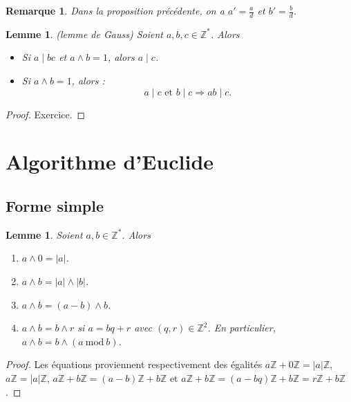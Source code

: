 \documentclass[12pt]{report}
\newtheorem*{rem}{Remarque}
\newtheorem{Lem}[thm]{Lemme}
\newcommand{\Z}{\mathbb{Z}}
\begin{document}
\begin{rem}
Dans la proposition précédente, on a $a'=\frac{a}{d}$ et $b'=\frac{b}{d}$.
\end{rem}


\begin{Lem}\label{lem_Gauss}(lemme de Gauss) Soient $a,b,c \in \mathbb{Z}^*$. Alors
\begin{itemize}
\item[$1)$] Si $a\mid bc$ et $a \wedge b=1$, alors $a \mid c$.
\item[$2)$] Si $a \wedge b=1$, alors :\[a \mid c \text{ et }b \mid c  \Rightarrow ab \mid c.\] 
\end{itemize}
\end{Lem}

\begin{proof}
Exercice.
\end{proof}



\section{Algorithme d'Euclide}

\subsection{Forme simple}






\begin{Lem}\label{lemAlgo_Euclide}
Soient $a,b \in \mathbb{Z}^* $. Alors
\begin{enumerate}

\item  $a\wedge 0=|a|$.
\item $a\wedge b=|a|\wedge|b|$.
\item $a\wedge b=(a-b)\wedge b$.
\item $a \wedge b=b\wedge r$ si $a=bq+r$ avec $(q,r)\in \mathbb{Z}^2$. En particulier, $a\wedge b=b\wedge( a\mathrm{\ mod\ }b)$.
\end{enumerate}
\end{Lem}

\begin{proof}
Les équations proviennent respectivement des égalités $a\Z+0\Z=|a|\Z$,  $a \mathbb{Z}=|a| \mathbb{Z}$, $a \mathbb{Z}+b \mathbb{Z}=(a-b)\mathbb{Z}+b\mathbb{Z}$ et $a\mathbb{Z}+b\mathbb{Z}=(a-bq)\mathbb{Z}+b\mathbb{Z}=r\mathbb{Z}+b\mathbb{Z}$.
\end{proof}
\end{document}
